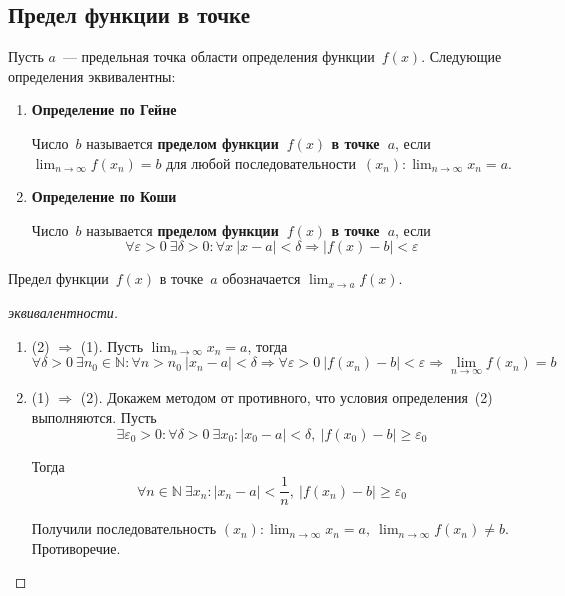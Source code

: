 \subsection{Предел функции в точке}
Пусть $a$~--- предельная точка области определения функции~$f(x)$.
Следующие определения эквивалентны:
\begin{enumerate}
	\item \textbf{Определение по Гейне}
	
	Число~$b$ называется \textbf{пределом функции~$f(x)$ в точке~$a$}, если $\displaystyle \lim_{n \to \infty} f(x_n) = b$ для любой последовательности~$\displaystyle (x_n): \lim_{n \to \infty} x_n = a$.
	
	\item \textbf{Определение по Коши}
	
	Число~$b$ называется \textbf{пределом функции~$f(x)$ в точке~$a$}, если
	\begin{equation*}
	\forall \varepsilon > 0 \ \exists \delta > 0 \colon \forall x \ |x - a| < \delta \Rightarrow |f(x) - b| < \varepsilon
	\end{equation*}
\end{enumerate}

Предел функции~$f(x)$ в точке~$a$ обозначается $\displaystyle \lim_{x \to a} f(x)$.
\begin{proof}[эквивалентности]
\begin{enumerate}
	\item (2) $\Rightarrow$ (1).
	Пусть $\displaystyle \lim_{n \to \infty} x_n = a$, тогда
	\begin{equation*}
	\forall \delta > 0 \ \exists n_0 \in \mathbb N \colon \forall n > n_0 \ |x_n - a| < \delta \Rightarrow
	\forall \varepsilon > 0 \ |f(x_n) - b| < \varepsilon \Rightarrow
	\lim_{n \to \infty} f(x_n) = b
	\end{equation*}
	
	\item (1) $\Rightarrow$ (2).
	Докажем методом от противного, что условия определения~(2) выполняются.
	Пусть
	\begin{equation*}
	\exists \varepsilon_0 > 0 \colon \forall \delta > 0 \ \exists x_0 \colon |x_0 - a| < \delta, \ |f(x_0) - b| \geqslant \varepsilon_0
	\end{equation*}
	
	Тогда
	\begin{equation*}
	\forall n \in \mathbb N \ \exists x_n \colon |x_n - a| < \frac1n, \ |f(x_n) - b| \geqslant \varepsilon_0
	\end{equation*}
	
	Получили последовательность $\displaystyle (x_n) \colon \lim_{n \to \infty} x_n = a, \ \lim_{n \to \infty} f(x_n) \neq b$.
	Противоречие.
\end{enumerate}
\end{proof}

